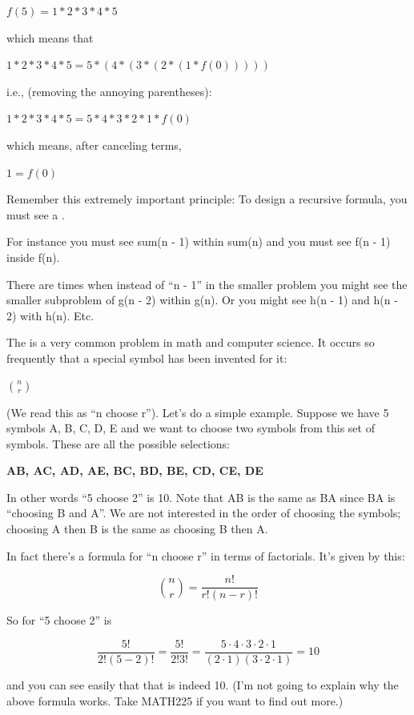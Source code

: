 $f(5) = 1 * 2 * 3 * 4 * 5$

which means that

$1 * 2 * 3 * 4 * 5 = 5 * (4 * (3 * (2 * (1 * f(0)))))$

i.e., (removing the annoying parentheses):

$1 * 2 * 3 * 4 * 5 = 5 * 4 * 3 * 2 * 1 * f(0)$

which means, after canceling terms,

$1 = f(0)$

Remember this extremely important principle: To design a recursive
formula, you must see a .

For instance you must see sum(n - 1) within sum(n) and you must see f(n - 1) inside f(n).

There are times when instead of ``n - 1'' in the smaller problem you
might see the smaller subproblem of g(n - 2) within g(n). Or you might
see h(n - 1) and h(n - 2) with h(n). Etc.


\newpage{}

The  is a very common
problem in math and computer science. It occurs so frequently that a
special symbol has been invented for it:

$\binom{n}{r}$

(We read this as ``n choose r''). Let's do a simple
example. Suppose we have 5 symbols A, B, C, D, E and we want to choose
two symbols from this set of symbols. These are all the possible
selections:

\textbf{AB, AC, AD, AE, BC, BD, BE, CD, CE, DE}

In other words ``5 choose 2'' is 10. Note that AB is the same as BA
since BA is ``choosing B and A''. We are not interested in the order of
choosing the symbols; choosing A then B is the same as choosing B then
A.

In fact there's a formula for ``n choose r'' in terms of
factorials. It's given by this:

\[
\binom{n}{r} = \frac{n!}{r!(n-r)!}
\]

So for ``5 choose 2'' is

\[
\frac{5!}{2!(5-2)!} = \frac{5!}{2!3!} = \frac{5 \cdot 4 \cdot 3 \cdot 2 \cdot 1}{(2 \cdot 1)(3 \cdot 2 \cdot 1)} = 10
\]

and you can see easily that that is indeed 10. (I'm not
going to explain why the above formula works. Take MATH225 if you want
to find out more.)

